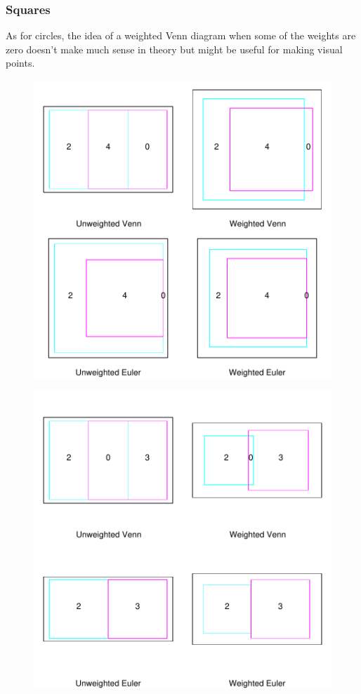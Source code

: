 \documentclass[a4paper]{article}
\begin{document}
\subsubsection{Squares}
As for circles, the idea of a weighted Venn diagram when some of the weights
are zero doesn't make much sense in theory but might be useful for making visual 
points. 
\begin{figure}[H]\begin{center}
\includegraphics{Vennfig-p2s01threef}
\end{center}\end{figure}


\begin{figure}[H]\begin{center}
\includegraphics{Vennfig-p2sthreef}
\end{center}\end{figure}
\end{document}
